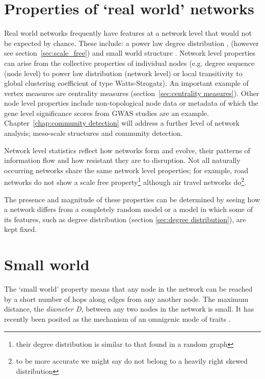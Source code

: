 \section{Properties of `real world' networks}
\label{sec:Properties of empirical networks}
Real world  networks frequently have features at a network level that would not be expected by chance. These include: a power law degree distribution \cite{barabasi1999emergence},\cite{barabasi1999mean} (however see section~\ref{sec:scale_free}) and small world structure \cite{watts1998collective}. Network level properties can arise from the collective properties of individual nodes (e.g. degree sequence (node level) to power law distribution (network level) or local transitivity to global clustering coefficient of type Watts-Strogatz). An important example of vertex measures are centrality measures (section~\ref{sec:centrality measures}). Other node level properties include  non-topological node data\cite{wang2016approach} or metadata\cite{peel2017ground} of which the gene level significance scores from GWAS studies are an example. Chapter~\ref{chap:community detection} will address a further level of network analysis; meso-scale structures and community detection. 

Network level statistics reflect how networks form and evolve, their patterns of information flow and how resistant they are to disruption.
Not all naturally occurring networks share the same network level properties; for example, road networks do not show a scale free property\cite{xie2007measuring}\footnote{their degree distribution is similar to that found in a random graph} although air travel networks do\cite{boccaletti2006complex}\footnote{to be more accurate we might say do not belong to a heavily right skewed distribution}.

The presence and magnitude of these properties can be determined by seeing how a network differs from a completely random model or a model in which some of its features, such as degree distribution (section \ref{sec:degree distribution}), are kept fixed. 







\section{Small world}
\label{sec:Small world}
The `small world' property means that any node in the network can be reached by a short number of hops along edges from any another node. The maximum distance, the \textit{diameter D}, between any two nodes in the network is small\cite{zhu2007getting}. It has recently been posited as the mechanism of an omnigenic mode of traits \cite{boyle2017expanded}.

